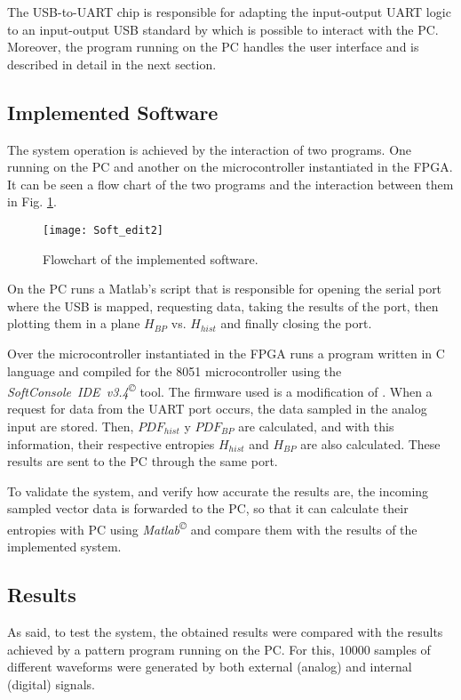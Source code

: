 The USB-to-UART chip is responsible for adapting the input-output UART logic to an input-output USB standard by which is possible to interact with the PC. Moreover, the program running on the PC handles the user interface and is described in detail in the next section.

\subsection{Implemented Software}
\label{sec:Software}

The system operation is achieved by the interaction of two programs. One running on the PC and another on the microcontroller instantiated in the FPGA. It can be seen a flow chart of the two programs and the interaction between them in Fig. \ref{fig.softflow}.
%
\begin{figure}[htpb]
\centering\texttt{[image: Soft\_edit2]}
\caption{Flowchart of the implemented software.}\label{fig.softflow}
\end{figure}
On the PC runs a Matlab's script that is responsible for opening the serial port where the USB is mapped, requesting data, taking the results of the port, then plotting them in a plane $H_{BP}$ vs. $H_{hist}$ and finally closing the port.

Over the microcontroller instantiated in the FPGA runs a program written in C language and compiled for the 8051 microcontroller using the \textit{SoftConsole~IDE~v3.4\textsuperscript\copyright} tool. The firmware used is a modification of \cite{Core8051sS}. When a request for data from the UART port occurs, the data sampled in the analog input are stored. Then, $PDF_{hist}$ y $PDF_{BP}$ are calculated, and with this information, their respective entropies $H_{hist}$ and $H_{BP}$ are also calculated. These results are sent to the PC through the same port.

To validate the system, and verify how accurate the results are, the incoming sampled vector data is forwarded to the PC, so that it can calculate their entropies with PC using \textit{Matlab\textsuperscript\copyright} and compare them with the results of the implemented system.

\subsection{Results}
\label{sec:resultados}
As said, to test the system, the obtained results were compared with the results achieved by a pattern program running on the PC. For this, $10000$ samples of different waveforms were generated by both external (analog) and internal (digital) signals.

